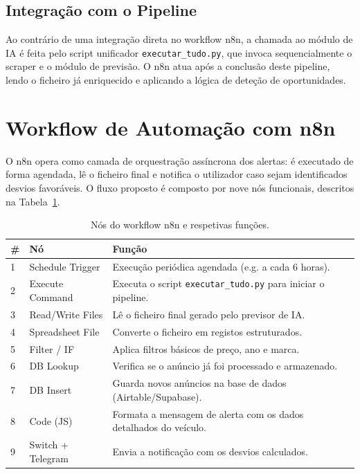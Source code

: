 \documentclass[11pt,a4paper]{article}
\begin{document}
\subsection{Integração com o Pipeline}
Ao contrário de uma integração direta no workflow n8n, a chamada ao módulo de IA é feita pelo script unificador \texttt{executar\_tudo.py}, que invoca sequencialmente o scraper e o módulo de previsão. O n8n atua após a conclusão deste pipeline, lendo o ficheiro já enriquecido e aplicando a lógica de deteção de oportunidades.

\section{Workflow de Automação com n8n}
O n8n opera como camada de orquestração assíncrona dos alertas: é executado de forma agendada, lê o ficheiro final e notifica o utilizador caso sejam identificados desvios favoráveis. O fluxo proposto é composto por nove nós funcionais, descritos na Tabela~\ref{tab:n8n_nodes}.

\begin{table}[H]
\centering
\caption{Nós do workflow n8n e respetivas funções.}
\label{tab:n8n_nodes}
\begin{tabular}{lll}
\toprule
\textbf{\#} & \textbf{Nó} & \textbf{Função} \\
\midrule
1 & Schedule Trigger & Execução periódica agendada (e.g. a cada 6 horas). \\
2 & Execute Command & Executa o script \texttt{executar\_tudo.py} para iniciar o pipeline. \\
3 & Read/Write Files & Lê o ficheiro final gerado pelo previsor de IA. \\
4 & Spreadsheet File & Converte o ficheiro em registos estruturados. \\
5 & Filter / IF & Aplica filtros básicos de preço, ano e marca. \\
6 & DB Lookup & Verifica se o anúncio já foi processado e armazenado. \\
7 & DB Insert & Guarda novos anúncios na base de dados (Airtable/Supabase). \\
8 & Code (JS) & Formata a mensagem de alerta com os dados detalhados do veículo. \\
9 & Switch + Telegram & Envia a notificação com os desvios calculados. \\
\bottomrule
\end{tabular}
\end{table}
\end{document}
